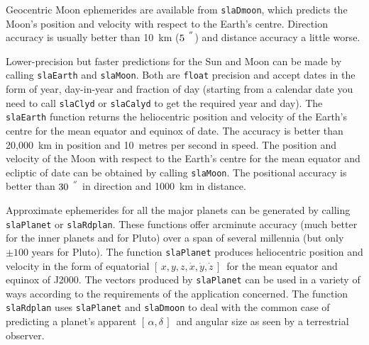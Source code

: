 \documentclass[11pt,fleqn,twoside]{article}
\renewcommand{\_}{{\tt\char'137}}     %
\newcommand{\radec}     {$[\,\alpha,\delta\,]$}
\newcommand{\xyzxyzd}   {$[\,x,y,z,\dot{x},\dot{y},\dot{z}\,]$}
\newcommand{\arcseci}[1] {$#1\hspace{0.05em}$\raisebox{-0.5ex}
                         {$^{'\hspace{-0.1em}'\hspace{0.0em}}$}}
\begin{document}
Geocentric Moon ephemerides are available from
{\tt slaDmoon},
which predicts the Moon's position and velocity with respect to
the Earth's centre.  Direction accuracy is usually better than
10~km (\arcseci{5}) and distance accuracy a little worse.

Lower-precision but faster predictions for the Sun and Moon
can be made by calling
{\tt slaEarth}
and
{\tt slaMoon}.
Both are {\tt float} precision and accept dates in the form of
year, day-in-year and fraction of day
(starting from a calendar date you need to call
{\tt slaClyd}
or
{\tt slaCalyd}
to get the required year and day).
The
{\tt slaEarth}
function returns the heliocentric position and velocity
of the Earth's centre for the mean equator and
equinox of date.  The accuracy is better than 20,000~km in position
and 10~metres per second in speed.
The
position and velocity of the Moon with respect to the
Earth's centre for the mean equator and ecliptic of date
can be obtained by calling
{\tt slaMoon}.
The positional accuracy is better than \arcseci{30} in direction
and 1000~km in distance.
 
Approximate ephemerides for all the major planets
can be generated by calling
{\tt slaPlanet}
or
{\tt slaRdplan}.  These functions offer arcminute accuracy (much
better for the inner planets and for Pluto) over a span of several
millennia (but only $\pm100$ years for Pluto).
The function
{\tt slaPlanet} produces heliocentric position and
velocity in the form of equatorial \xyzxyzd\ for the
mean equator and equinox of J2000.  The vectors
produced by
{\tt slaPlanet}
can be used in a variety of ways according to the
requirements of the application concerned.  The function
{\tt slaRdplan}
uses
{\tt slaPlanet}
and
{\tt slaDmoon}
to deal with the common case of predicting
a planet's apparent \radec\ and angular size as seen by a
terrestrial observer.
\end{document}
